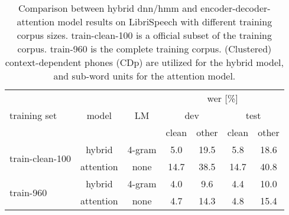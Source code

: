 \documentclass[a4paper]{article}
\begin{document}
\begin{table}[!ht]
\setlength{\tabcolsep}{3pt}
\centering
\caption{Comparison between hybrid \ac{dnn}/\ac{hmm} and encoder-decoder-attention model results on LibriSpeech with different training corpus sizes.
train-clean-100 is a official subset of the training corpus.
train-960 is the complete training corpus.
(Clustered) context-dependent phones (CDp) are utilized for the hybrid model,
and sub-word units for the attention model.}
\label{tab:size}
\begin{tabular}{|l|c|c|c|c|c|c|}
\hline
\multirow{3}{*}{training set} & \multirow{3}{*}{model} & \multirow{3}{*}{LM} & \multicolumn{4}{c|}{\acs*{wer} {[}\%{]}} \\ \cline{4-7}
                &         &  & \multicolumn{2}{c|}{dev} & \multicolumn{2}{c|}{test} \\ \cline{4-7}
                &         &  & clean & other & clean & other \\ \hline \hline
\multirow{2}{*}{train-clean-100} & hybrid    & 4-gram &  5.0  & 19.5  & 5.8  & 18.6   \\ \cline{2-7}
                & attention & none &  14.7     &   38.5    &  14.7    &  40.8      \\ \hline
\multirow{2}{*}{train-960}      & hybrid   & 4-gram  &  4.0  &  9.6  & 4.4  & 10.0   \\ \cline{2-7}
                & attention & none &   4.7   &   14.3   &  4.8  &  15.4   \\ \hline
\end{tabular}
\end{table}
\end{document}
